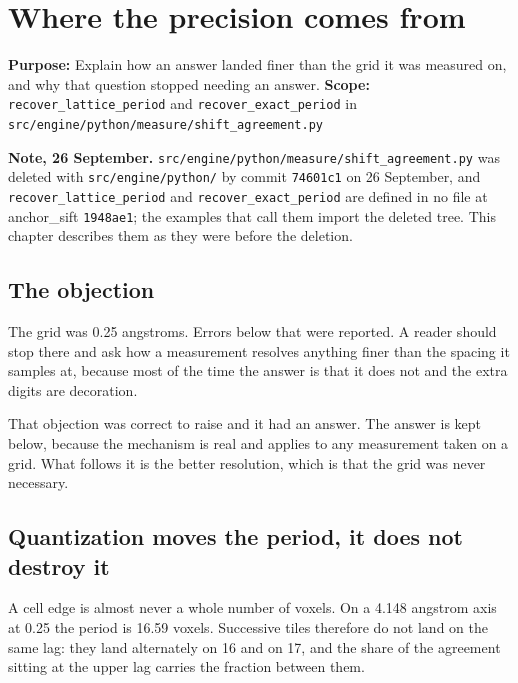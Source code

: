 \chapter{Where the precision comes from}

\textbf{Purpose:} Explain how an answer landed finer than the grid it was measured on, and why that question stopped needing an answer.
\textbf{Scope:} \texttt{recover\_\allowbreak{}lattice\_\allowbreak{}period} and \texttt{recover\_\allowbreak{}exact\_\allowbreak{}period} in \texttt{src/\allowbreak{}engine/\allowbreak{}python/\allowbreak{}measure/\allowbreak{}shift\_\allowbreak{}agreement.\allowbreak{}py}

\textbf{Note, 26 September.} \texttt{src/\allowbreak{}engine/\allowbreak{}python/\allowbreak{}measure/\allowbreak{}shift\_\allowbreak{}agreement.\allowbreak{}py} was deleted with \texttt{src/\allowbreak{}engine/\allowbreak{}python/} by commit \texttt{74601c1} on 26 September, and \texttt{recover\_\allowbreak{}lattice\_\allowbreak{}period} and \texttt{recover\_\allowbreak{}exact\_\allowbreak{}period} are defined in no file at anchor\_sift \texttt{1948ae1}; the examples that call them import the deleted tree. This chapter describes them as they were before the deletion.

\section{The objection}

The grid was 0.25 angstroms. Errors below that were reported. A reader should stop there and ask how a measurement resolves anything finer than the spacing it samples at, because most of the time the answer is that it does not and the extra digits are decoration.

That objection was correct to raise and it had an answer. The answer is kept below, because the mechanism is real and applies to any measurement taken on a grid. What follows it is the better resolution, which is that the grid was never necessary.

\section{Quantization moves the period, it does not destroy it}

A cell edge is almost never a whole number of voxels. On a 4.148 angstrom axis at 0.25 the period is 16.59 voxels. Successive tiles therefore do not land on the same lag: they land alternately on 16 and on 17, and the share of the agreement sitting at the upper lag carries the fraction between them.

